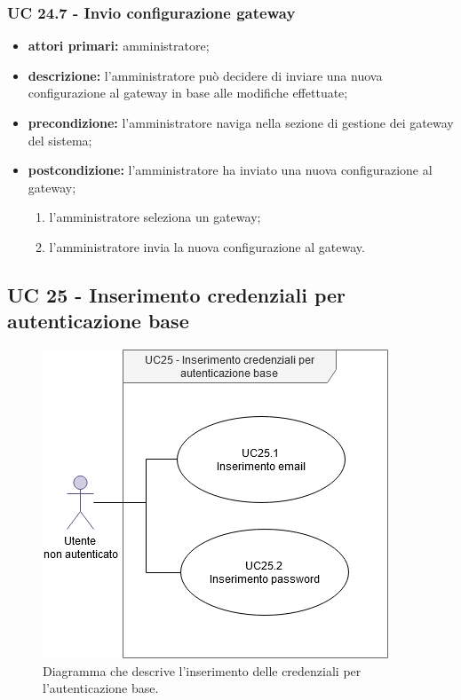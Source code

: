 			\subsubsection{UC 24.7 - Invio configurazione gateway}
			\begin{itemize}
				\item \textbf{attori primari:} amministratore;
				\item \textbf{descrizione:} l'amministratore può decidere di inviare una nuova configurazione al gateway in base alle modifiche effettuate;
				\item \textbf{precondizione:} l'amministratore naviga nella sezione di gestione dei gateway del sistema;
				\item \textbf{postcondizione:} l'amministratore ha inviato una nuova configurazione al gateway;
				\begin{enumerate}
					\item l'amministratore seleziona un gateway;
					\item l'amministratore invia la nuova configurazione al gateway.
				\end{enumerate} 
			\end{itemize}
			
		\subsection{UC 25 - Inserimento credenziali per autenticazione base}
		
		\begin{figure}[H]
			\centering
			\includegraphics[scale=0.675]{res/images/uc25}
			\caption{Diagramma che descrive l'inserimento delle credenziali per l'autenticazione base.}
		\end{figure}
		
